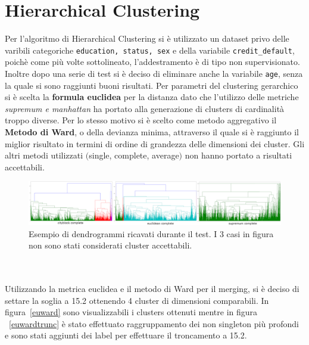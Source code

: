 \section{Hierarchical Clustering}
Per l'algoritmo di Hierarchical Clustering si \`e utilizzato un dataset privo delle varibili categoriche \texttt{education, status, sex} e della variabile \texttt{credit\_default}, poich\`e come pi\`u volte sottolineato, l'addestramento \`e di tipo non supervisionato. Inoltre dopo una serie di test si \`e deciso di eliminare anche la variabile \texttt{age}, senza la quale si sono raggiunti buoni risultati. Per parametri del clustering gerarchico si \`e scelta la \textbf{formula euclidea} per la distanza dato che l'utilizzo delle metriche \textit{supremum e manhattan} ha portato alla generazione di clusters di cardinalità troppo diverse. Per lo stesso motivo si \`e scelto come metodo aggregativo il \textbf{Metodo di Ward}, o della devianza minima, attraverso il quale si \`e raggiunto il miglior risultato in termini di ordine di grandezza delle dimensioni dei cluster. Gli altri metodi utilizzati $($single, complete, average$)$ non hanno portato a risultati accettabili.
\begin{figure}[H]
\includegraphics[width=\linewidth]{img/complete.png}
\caption{Esempio di dendrogrammi ricavati durante il test. I 3 casi in figura non sono stati considerati cluster accettabili.}
\label{dendro-complete}
\end{figure} 
\mbox{}\\
\mbox{}\\
Utilizzando la metrica euclidea e il metodo di Ward per il merging, si \`e deciso di settare la soglia a 15.2 ottenendo 4 cluster di dimensioni comparabili. In figura~\ref{euward} sono visualizzabili i clusters ottenuti mentre in figura ~\ref{euwardtrunc} \`e stato effettuato raggruppamento dei non singleton pi\`u profondi e sono stati aggiunti dei label per effettuare il troncamento a 15.2.
